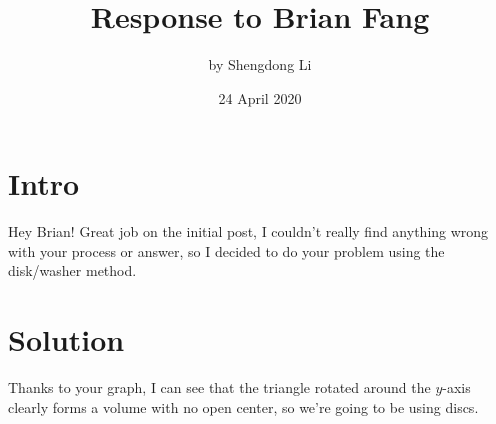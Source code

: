 \documentclass[letterpaper, 12pt]{article}
\begin{document}
\title{Response to Brian Fang}
\author{by Shengdong Li}
\date{24 April 2020}
\maketitle

\section{Intro}
Hey Brian! Great job on the initial post, I couldn't really find anything wrong with your process or answer, so I decided to do your problem using the disk/washer method.

\section{Solution}
Thanks to your graph, I can see that the triangle rotated around the $y$-axis clearly forms a volume with no open center, so we're going to be using discs.
\end{document}
